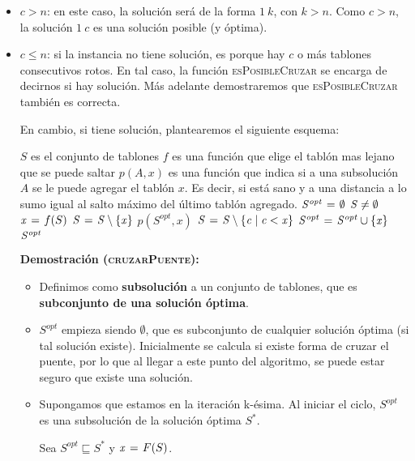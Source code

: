 \begin{itemize}
  \item $c > n$: en este caso, la solución será de la forma $1 \ k$, con $k > n$. Como $c > n$, la
  solución $1 \ c$ es una solución posible (y óptima).

  \item $c \leq n$: si la instancia no tiene solución, es porque hay $c$ o más tablones
  consecutivos rotos. En tal caso, la función \textsc{esPosibleCruzar} se encarga de
  decirnos si hay solución. Más adelante demostraremos que \textsc{esPosibleCruzar}
  también es correcta. \medskip

  En cambio, si tiene solución, plantearemos el siguiente esquema:

  \begin{codebox}
  \li \Comment $S$ es el conjunto de tablones
  \li \Comment $f$ es una función que elige el tablón mas lejano que se puede saltar
  \li \Comment $p(A, x)$ es una función que indica si a una subsolución $A$ se le
  \li \Comment   puede agregar el tablón $x$. Es decir, si está sano y a una distancia
  \li \Comment   a lo sumo igual al salto máximo del último tablón agregado.
  \li $\id{S^{opt}} \gets \emptyset$
  \li \While $\id{S} \neq \emptyset$
  \li     \Do
    			$\id{x} \gets f(S)$
  \li  			$\id{S} \gets \id{S} \setminus \{\id{x}\}$
  \li			\If $p(S^{opt}, x)$
    				\Then
  \li					$\id{S} \gets \id{S} \setminus \{\id{c} \mid \id{c} < \id{x}\}$
  \li					$\id{S^{opt}} \gets \id{S^{opt}} \cup \{\id{x}\}$
    				\End
    		\End
  \li \Return $\id{S^{opt}}$
  \end{codebox}

  \textbf{Demostración (\textsc{cruzarPuente}):}
  \begin{itemize}
    \item Definimos como \textbf{subsolución} a un conjunto de tablones, que
    es \textbf{subconjunto de una solución óptima}.
    \item $S^{opt}$ empieza siendo $\emptyset$, que es subconjunto de cualquier
    solución óptima (si tal solución existe). Inicialmente se calcula si
    existe forma de cruzar el puente, por lo que al llegar a este punto del
    algoritmo, se puede estar seguro que existe una solución.
    \item Supongamos que estamos en la iteración k-ésima. Al iniciar
    el ciclo, $S^{opt}$ es una subsolución de la solución óptima $S^{*}$. \medskip
    
    Sea $S^{opt} \sqsubseteq S^{*}$ y $\id{x} \gets F(S)$. \medskip
    

\end{itemize}
\end{itemize}
